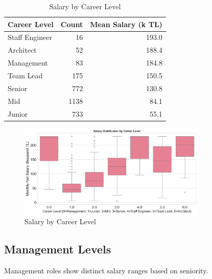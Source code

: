 \documentclass[12pt,a4paper]{article}
\begin{document}
\begin{table}[H]
	\centering
	\small
	\begin{tabular}{lrr}
		\toprule
		\textbf{Career Level} & \textbf{Count} & \textbf{Mean Salary (k TL)} \\
		\midrule
		Staff Engineer        & 16             & 193.0                       \\
		Architect             & 52             & 188.4                       \\
		Management            & 83             & 184.8                       \\
		Team Lead             & 175            & 150.5                       \\
		Senior                & 772            & 130.8                       \\
		Mid                   & 1138           & 84.1                        \\
		Junior                & 733            & 55.1                        \\
		\bottomrule
	\end{tabular}
	\caption{Salary by Career Level}
\end{table}

\begin{figure}[H]
	\centering
	\includegraphics[width=0.8\textwidth]{figures/boxplot_seniority.png}
	\caption{Salary by Career Level}
\end{figure}

\subsection{Management Levels}
Management roles show distinct salary ranges based on seniority.
\end{document}
